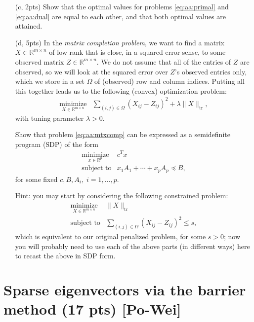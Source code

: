 \documentclass{article}
\theoremstyle{remark}
\theoremstyle{definition}
\newcommand{\minimize}{\mathop{\mathrm{minimize}}}
\newcommand{\minimizewrt}[1]{\underset{#1}{\minimize}}
\newcommand{\subjectto}{\mbox{subject to}}
\newcommand{\reals}{\mathbb R}
\def\tr{\mathrm{tr}}
\begin{document}
\begin{enumerate}
\item[(c, 2pts)]
Show that the optimal values for problems \eqref{eq:aa:primal} and \eqref{eq:aa:dual} are equal to each other, and that both optimal values are attained.

\item[(d, 5pts)]
In the \textit{matrix completion problem}, we want to find a matrix $X \in \reals^{m \times n}$ of low rank that is close, in a squared error sense, to some observed matrix $Z \in \reals^{m \times n}$.  We do not assume that all of the entries of $Z$ are observed, so we will look at the squared error over $Z$'s observed entries only, which we store in a set $\Omega$ of (observed) row and column indices.  Putting all this together leads us to the following (convex) optimization problem:
\begin{equation}
\begin{array}{ll}
\minimizewrt{X \in \mathbb{R}^{m \times n}} & \sum_{(i,j) \in \Omega} ( X_{ij} - Z_{ij} )^2 + \lambda \| X \|_{\tr},
\end{array}
\label{eq:aa:mtxcomp}
\end{equation}
with tuning parameter $\lambda > 0$.

Show that problem \eqref{eq:aa:mtxcomp} can be expressed as a semidefinite
program (SDP) of the form
\begin{equation*}
\begin{array}{ll}
\minimizewrt{x \in \mathbb{R}^p} & c^T x \\
\subjectto & x_1 A_1 + \cdots + x_p A_p \preceq B,
\end{array}
\end{equation*}
for some fixed $c, B, A_i, \; i=1,\ldots,p$.

Hint: you may start by considering the following constrained problem:
\begin{equation*}
\begin{array}{ll}
\minimizewrt{X \in \mathbb{R}^{m \times n}} & \| X \|_{\tr} \\
\subjectto & \sum_{(i,j) \in \Omega} ( X_{ij} - Z_{ij} )^2 \leq s,
\end{array}
\end{equation*}
which is equivalent to our original penalized problem, for some $s>0$; now you
will probably need to use each of the above parts (in different ways) here to
recast the above in SDP form. 
\end{enumerate}\section{Sparse eigenvectors via the barrier method (17 pts) [Po-Wei]}
\end{document}
